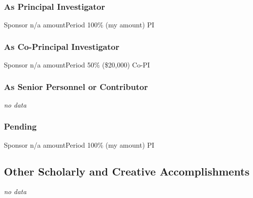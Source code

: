     \subsubsection{As Principal Investigator}
        \begin{grants}
            
            {Sponsor}
            {n/a}
            {amount}{Period}
            {100\% (my amount)}
            {PI}

        \end{grants}

    \subsubsection{As Co-Principal Investigator}
        \begin{grants}
        
            {Sponsor}
            {n/a}
            {amount}{Period}
            {50\% (\$20,000)}
            {Co-PI}

        \end{grants}

    \subsubsection{As Senior Personnel or Contributor}
    \label{subsubsec:fundedch}
        \begin{numerate}
            \item[] \textit{no data}
        \end{numerate}

    \subsubsection{Pending}
    \label{subsubsec:pendingd}
        \begin{grants}

            {Sponsor}
            {n/a}
            {amount}{Period}
            {100\% (my amount)}
            {PI}

        \end{grants}


    \subsection{Other Scholarly and Creative Accomplishments}
    \label{subsec:otherscholarly}
        \begin{numerate}
            \item[] \textit{no data}
        \end{numerate}

